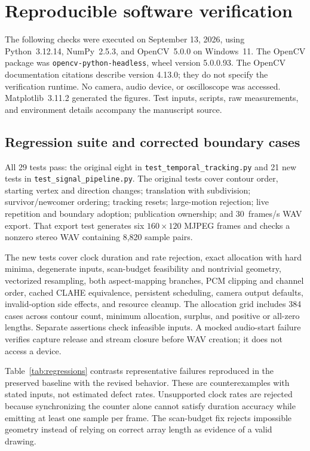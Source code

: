 \documentclass[11pt,a4paper]{article}
\newcommand{\code}[1]{\texttt{#1}}
\begin{document}
\section{Reproducible software verification}\label{sec:verification}
The following checks were executed on September 13, 2026, using Python~3.12.14, NumPy~2.5.3, and OpenCV~5.0.0 on Windows~11. The OpenCV package was \code{opencv-python-headless}, wheel version 5.0.0.93. The OpenCV documentation citations describe version 4.13.0; they do not specify the verification runtime. No camera, audio device, or oscilloscope was accessed. Matplotlib~3.11.2 generated the figures. Test inputs, scripts, raw measurements, and environment details accompany the manuscript source.

\subsection{Regression suite and corrected boundary cases}
All 29 tests pass: the original eight in \code{test\_temporal\_tracking.py} and 21 new tests in \code{test\_signal\_pipeline.py}. The original tests cover contour order, starting vertex and direction changes; translation with subdivision; survivor/newcomer ordering; tracking resets; large-motion rejection; live repetition and boundary adoption; publication ownership; and 30~frames/s WAV export. That export test generates six $160\times120$ MJPEG frames and checks a nonzero stereo WAV containing 8,820 sample pairs.

The new tests cover clock duration and rate rejection, exact allocation with hard minima, degenerate inputs, scan-budget feasibility and nontrivial geometry, vectorized resampling, both aspect-mapping branches, PCM clipping and channel order, cached CLAHE equivalence, persistent scheduling, camera output defaults, invalid-option side effects, and resource cleanup. The allocation grid includes 384 cases across contour count, minimum allocation, surplus, and positive or all-zero lengths. Separate assertions check infeasible inputs. A mocked audio-start failure verifies capture release and stream closure before WAV creation; it does not access a device.

Table~\ref{tab:regressions} contrasts representative failures reproduced in the preserved baseline with the revised behavior. These are counterexamples with stated inputs, not estimated defect rates. Unsupported clock rates are rejected because synchronizing the counter alone cannot satisfy duration accuracy while emitting at least one sample per frame. The scan-budget fix rejects impossible geometry instead of relying on correct array length as evidence of a valid drawing.
\end{document}
